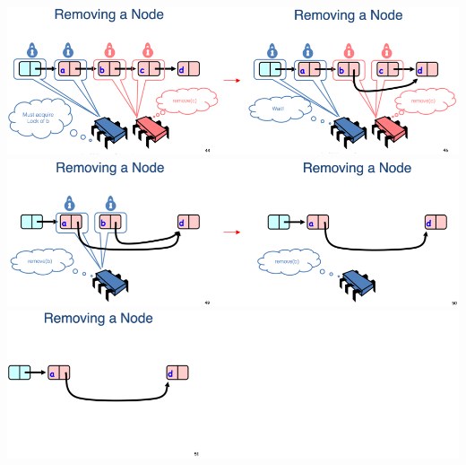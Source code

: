 \documentclass[12pt]{article}
\begin{document}
\begin{itemize}
\begin{center}
    \includegraphics[width=\linewidth]{../images/midterm_3_solution_7.png}
    \includegraphics[width=\linewidth]{../images/midterm_3_solution_8.png}
    \includegraphics[width=\linewidth]{../images/midterm_3_solution_9.png}
    \end{center}

\end{itemize}
\end{document}
